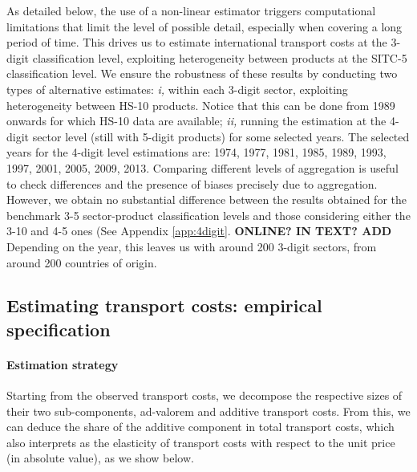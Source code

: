 \documentclass[a4paper,11pt]{article}
\begin{document}
As detailed below, the use of a non-linear estimator triggers computational limitations that limit the level of possible detail, especially when covering a long period of time. This drives us to estimate international transport costs at the 3-digit classification level, exploiting heterogeneity between products at the SITC-5 classification level. We ensure the robustness of these results by conducting two types of alternative estimates: \textit{i,} within each 3-digit sector, exploiting heterogeneity between HS-10 products. Notice that this can be done from 1989 onwards for which HS-10 data are available; \textit{ii,} running the estimation at the 4-digit sector level (still with 5-digit products) for some selected years. The selected years for the 4-digit level estimations are: 1974, 1977, 1981, 1985, 1989, 1993, 1997, 2001, 2005, 2009, 2013. Comparing different levels of aggregation is useful to check differences and the presence of biases precisely due to aggregation. However, we obtain no substantial difference between the results obtained for the benchmark 3-5 sector-product classification levels and those considering either the 3-10 and 4-5 ones (See Appendix \ref{app:4digit}. \textbf{ONLINE? IN TEXT? ADD}
Depending on the year, this leaves us with around 200 3-digit sectors, from around 200 countries of origin.

\subsection{Estimating transport costs: empirical specification}

\paragraph{Estimation strategy} Starting from the observed transport costs, we decompose the respective sizes of their two sub-components, ad-valorem and additive transport costs. From this, we can deduce the share of the additive component in total transport costs, which also interprets as the elasticity of transport costs with respect to the unit price (in absolute value), as we show below. \smallskip
\end{document}
